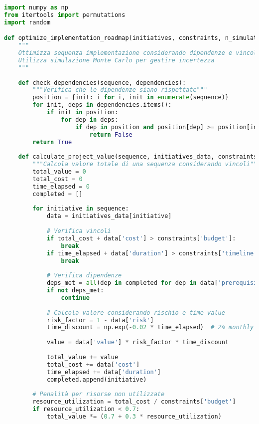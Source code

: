 \begin{lstlisting}[language=Python, caption=Algoritmo di Ottimizzazione Roadmap con Vincoli]
import numpy as np
from itertools import permutations
import random

def optimize_implementation_roadmap(initiatives, constraints, n_simulations=10000):
    """
    Ottimizza sequenza implementazione considerando dipendenze e vincoli
    Utilizza simulazione Monte Carlo per gestire incertezza
    """
    
    def check_dependencies(sequence, dependencies):
        """Verifica che le dipendenze siano rispettate"""
        position = {init: i for i, init in enumerate(sequence)}
        for init, deps in dependencies.items():
            if init in position:
                for dep in deps:
                    if dep in position and position[dep] >= position[init]:
                        return False
        return True
    
    def calculate_project_value(sequence, initiatives_data, constraints):
        """Calcola valore totale di una sequenza considerando vincoli"""
        total_value = 0
        total_cost = 0
        time_elapsed = 0
        completed = []
        
        for initiative in sequence:
            data = initiatives_data[initiative]
            
            # Verifica vincoli
            if total_cost + data['cost'] > constraints['budget']:
                break
            if time_elapsed + data['duration'] > constraints['timeline']:
                break
            
            # Verifica dipendenze
            deps_met = all(dep in completed for dep in data['prerequisites'])
            if not deps_met:
                continue
            
            # Calcola valore considerando rischio e time value
            risk_factor = 1 - data['risk']
            time_discount = np.exp(-0.02 * time_elapsed)  # 2% monthly discount
            
            value = data['value'] * risk_factor * time_discount
            
            total_value += value
            total_cost += data['cost']
            time_elapsed += data['duration']
            completed.append(initiative)
        
        # Penalità per risorse non utilizzate
        resource_utilization = total_cost / constraints['budget']
        if resource_utilization < 0.7:
            total_value *= (0.7 + 0.3 * resource_utilization)
        

\end{lstlisting}
